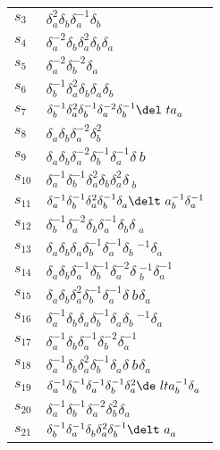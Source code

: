 \documentclass{article}
\begin{document}
\begin{center}
\begin{tabular}{ll}
$s_{3}$ & $\delta_a^{2}\delta_b^{}\delta_a^{-1}\delta_b^{}$ \\
$s_{4}$ & $\delta_a^{-2}\delta_b^{}\delta_a^{2}\delta_b^{}\delta_a^{}$ \\
$s_{5}$ & $\delta_a^{-2}\delta_b^{-2}\delta_a^{}$ \\
$s_{6}$ & $\delta_b^{-1}\delta_a^{2}\delta_b^{}\delta_a^{}\delta_b^{}$ \\
$s_{7}$ & $\delta_b^{-1}\delta_a^{2}\delta_b^{-1}\delta_a^{-2}\delta_b^{-1}\del\
ta_a^{}$ \\
$s_{8}$ & $\delta_a^{}\delta_b^{}\delta_a^{-2}\delta_b^{2}$ \\
$s_{9}$ & $\delta_a^{}\delta_b^{}\delta_a^{-2}\delta_b^{-1}\delta_a^{-1}\delta_\
b^{}$ \\
$s_{10}$ & $\delta_a^{-1}\delta_b^{-1}\delta_a^{2}\delta_b^{}\delta_a^{2}\delta\
_b^{}$ \\
$s_{11}$ & $\delta_a^{-1}\delta_b^{-1}\delta_a^{2}\delta_b^{-1}\delta_a^{}\delt\
a_b^{-1}\delta_a^{-1}$ \\
$s_{12}$ & $\delta_b^{-1}\delta_a^{-2}\delta_b^{}\delta_a^{-1}\delta_b^{}\delta\
_a^{}$ \\
$s_{13}$ & $\delta_a^{}\delta_b^{}\delta_a^{}\delta_b^{-1}\delta_a^{-1}\delta_b\
^{-1}\delta_a^{}$ \\
$s_{14}$ & $\delta_a^{}\delta_b^{}\delta_a^{-1}\delta_b^{-1}\delta_a^{-2}\delta\
_b^{-1}\delta_a^{-1}$ \\
$s_{15}$ & $\delta_a^{}\delta_b^{}\delta_a^{2}\delta_b^{-1}\delta_a^{-1}\delta_\
b^{}\delta_a^{}$ \\
$s_{16}$ & $\delta_a^{-1}\delta_b^{}\delta_a^{}\delta_b^{-1}\delta_a^{}\delta_b\
^{-1}\delta_a^{}$ \\
$s_{17}$ & $\delta_a^{-1}\delta_b^{}\delta_a^{-1}\delta_b^{-2}\delta_a^{-1}$ \\
$s_{18}$ & $\delta_a^{-1}\delta_b^{}\delta_a^{2}\delta_b^{-1}\delta_a^{}\delta_\
b^{}\delta_a^{}$ \\
$s_{19}$ & $\delta_a^{-1}\delta_b^{-1}\delta_a^{-1}\delta_b^{-1}\delta_a^{2}\de\
lta_b^{-1}\delta_a^{}$ \\
$s_{20}$ & $\delta_a^{-1}\delta_b^{-1}\delta_a^{-2}\delta_b^{2}\delta_a^{}$ \\
$s_{21}$ & $\delta_b^{-1}\delta_a^{-1}\delta_b^{}\delta_a^{2}\delta_b^{-1}\delt\
a_a^{}$ \\
\bottomrule
\end{tabular}
\end{center}

\thispagestyle{empty}
\end{document}

